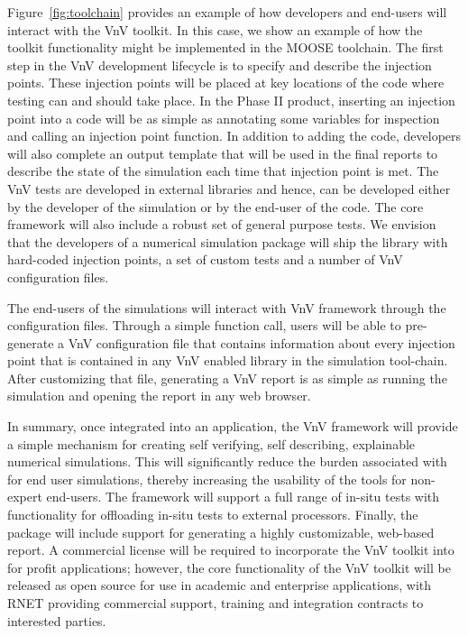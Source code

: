 Figure~\ref{fig:toolchain} provides an example of how developers and end-users will interact with the VnV toolkit. In this case, we show an example of how the toolkit functionality might be implemented in the MOOSE toolchain. The first step in the VnV development lifecycle is to specify and describe the injection points. These injection points will be placed at key locations of the code where testing can and should take place. In the Phase II product, inserting an injection point into a code will be as simple as annotating some variables for inspection and calling an injection point function. In addition to adding the code, developers will also complete an output template that will be used in the final \VV reports to describe the state of the simulation each time that injection point is met. The VnV tests are developed in external libraries and hence, can be developed either by the developer of the simulation or by the end-user of the code. The core framework will also include a robust set of general purpose \VV tests. We envision that the developers of a numerical simulation package will ship the library with hard-coded injection points, a set of custom \VV tests and a number of VnV configuration files. 

The end-users of the simulations will interact with VnV framework through the configuration files. Through a simple function call, users will be able to pre-generate a VnV configuration file that contains information about every injection point that is contained in any VnV enabled library in the simulation tool-chain. After customizing that file, generating a VnV report is as simple as running the simulation and opening the report in any web browser.
 
In summary, once integrated into an application, the VnV framework will provide a simple mechanism for creating self verifying, self describing, explainable numerical simulations. This will significantly reduce the burden associated with \VV for end user simulations, thereby increasing the usability of the tools for non-expert end-users. The framework will support a full range of in-situ \VV tests with functionality for offloading in-situ tests to external processors. Finally, the package will include support for generating a highly customizable, web-based \VV report. A commercial license will be required to incorporate the VnV toolkit into for profit applications; however, the core functionality of the VnV toolkit will be released as open source for use in academic and enterprise applications, with RNET providing commercial support, training and integration contracts to interested parties. 


